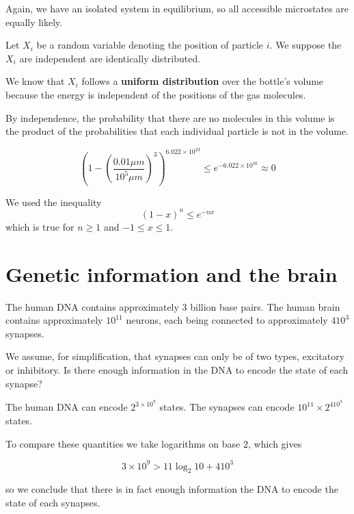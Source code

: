 \documentclass[english]{article}
\begin{document}
	Again, we have an isolated system in equilibrium, so all accessible microstates are equally likely.
	
	Let $X_i$ be a random variable denoting the position of particle $i$. We suppose the $X_i$ are independent are identically distributed.
	
	We know that $X_i$ follows a \textbf{uniform distribution} over the bottle's volume because the energy is independent of the positions of the gas molecules.
	
	 By independence, the probability that there are no molecules in this volume is the product of the probabilities that each individual particle is not in the volume.
	 
	 $$ \left( 1 - \left(\frac{0.01 \mu m}{10^5 \mu m}\right)^3 \right)^{6.022 \times 10^{23}} \leq e^{-6.022 \times 10^{16}} \approx 0 $$
	 
	 \begin{tcolorbox}[colback=yellow!5!white,colframe=yellow!75!black]
	 	We used the inequality
	 	$$ (1-x)^n \leq e^{-nx} $$
	 	which is true for $ n \geq 1$ and $-1 \leq x \leq 1$.
	 \end{tcolorbox}

	\section{Genetic information and the brain}
	\begin{tcolorbox}[colback=blue!5!white,colframe=blue!75!black]
		\quad The human DNA contains approximately $3$ billion base pairs. The human brain contains approximately $10^{11}$ neurons, each being connected to approximately $410^3$ synapses.
		
		\quad We assume, for simplification, that synapses can only be of two types, excitatory or inhibitory. Is there enough information in the DNA to encode the state of each synapse?
	\end{tcolorbox}

	The human DNA can encode $2^{3 \times 10^9}$ states. The synapses can encode $10^{11} \times 2^{410^3}$ states.
	
	To compare these quantities we take logarithms on base $2$, which gives
	
	$$ 3 \times 10^9 > 11 \log_{2} 10 + 410^3 $$
	
	so we conclude that there is in fact enough information the DNA to encode the state of each synapses.
	
\end{document}
